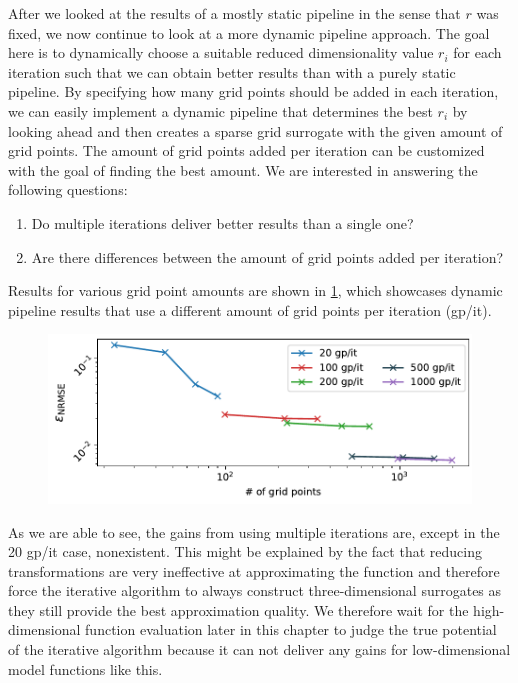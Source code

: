 \documentclass[
  a4paper,  %
  twoside,  %
  bibliography=totoc,
  headsepline,
  cleardoublepage=empty,
  parskip=half,
  draft=false
]{scrbook}
\begin{document}
After we looked at the results of a mostly static pipeline in the sense that $r$ was fixed, we now continue to look at a more dynamic pipeline approach.
The goal here is to dynamically choose a suitable reduced dimensionality value $r_i$ for each iteration such that we can obtain better results than with a purely static pipeline.
By specifying how many grid points should be added in each iteration, we can easily implement a dynamic pipeline that determines the best $r_i$ by looking ahead and then creates a sparse grid surrogate with the given amount of grid points.
The amount of grid points added per iteration can be customized with the goal of finding the best amount.
We are interested in answering the following questions:
\begin{enumerate}
\item Do multiple iterations deliver better results than a single one?
\item Are there differences between the amount of grid points added per iteration?
\end{enumerate}
Results for various grid point amounts are shown in \cref{fig:ishigami_dyn}, which showcases dynamic pipeline results that use a different amount of grid points per iteration (gp/it).

\begin{mdframed}[style=style]
\begin{figure}[H]
\vspace{-2mm}
\includegraphics[width=\textwidth]{graphics/ishigami_dynamic}\vspace{-4mm}
\delimit
{}
\label{fig:ishigami_dyn}
\end{figure}
\end{mdframed}
%
As we are able to see, the gains from using multiple iterations are, except in the 20 gp/it case, nonexistent.
This might be explained by the fact that reducing transformations are very ineffective at approximating the function and therefore force the iterative algorithm to always construct three-dimensional surrogates as they still provide the best approximation quality.
We therefore wait for the high-dimensional function evaluation later in this chapter to judge the true potential of the iterative algorithm because it can not deliver any gains for low-dimensional model functions like this.
\end{document}
